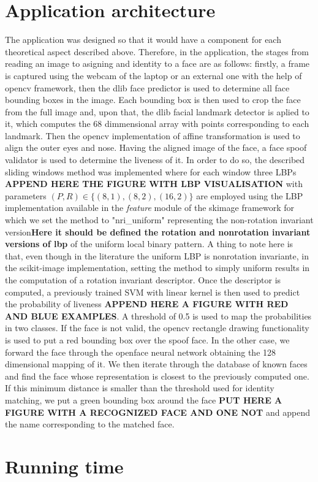 \section{Application architecture}
The application was designed so that it would have a component for each theoretical aspect described above. Therefore, in the application, the stages from reading an image to asigning and identity to a face are as follows: firstly, a frame is captured using the webcam of the laptop or an external one with the help of opencv framework, then the dlib \cite{dlib09} face predictor is used to determine all face bounding boxes in the image. 
Each bounding box is then used to crop the face from the full image and, upon that, the dlib facial landmark detector is aplied to it, which computes the 68 dimmensional array with points corresponding to each landmark. 
Then the opencv implementation of affine transformation is used to align the outer eyes and nose. Having the aligned image of the face, a face spoof validator is used to determine the liveness of it. 
In order to do so, the described sliding windows method was implemented where for each window three LBPs \textbf{APPEND HERE THE FIGURE WITH LBP VISUALISATION} with parameters $(P,R) \in \{(8,1), (8,2), (16,2)\}$ are employed using the LBP implementation available in the \textit{feature} module of the skimage \cite{scikit-image} framework for which we set the method to "nri\_uniform" representing the non-rotation invariant version\textbf{Here it should be defined the rotation and nonrotation invariant versions of lbp} of the uniform local binary pattern. A thing to note here is that, even though in the literature the uniform LBP is nonrotation invariante, in the scikit-image \cite{scikit-image} implementation, setting the method to simply uniform results in the computation of a rotation invariant descriptor. 
Once the descriptor is computed, a previously trained SVM with linear kernel is then used to predict the probability of liveness \textbf{APPEND HERE A FIGURE WITH RED AND BLUE EXAMPLES}. A threshold of 0.5 is used to map the probabilities in two classes. If the face is not valid, the opencv rectangle drawing functionality is used to put a red bounding box over the spoof face. In the other case, we forward the face through the openface neural network obtaining the 128 dimensional mapping of it. We then iterate through the database of known faces and find the face whose representation is closest to the previously computed one. If this minimum distance is smaller than the threshold used for identity matching, we put a green bounding box around the face \textbf{PUT HERE A FIGURE WITH A RECOGNIZED FACE AND ONE NOT} and append the name corresponding to the matched face. 
\section{Running time}
